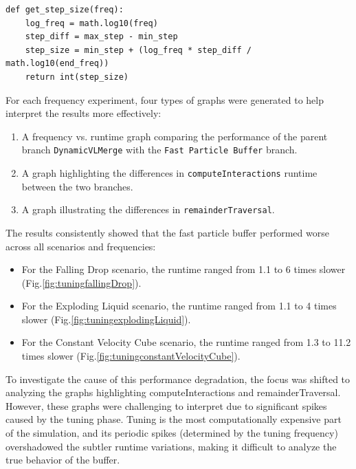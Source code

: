 \begin{lstlisting}[style=mypython]
def get_step_size(freq):
    log_freq = math.log10(freq)
    step_diff = max_step - min_step
    step_size = min_step + (log_freq * step_diff / math.log10(end_freq))
    return int(step_size)
\end{lstlisting}

For each frequency experiment, four types of graphs were generated to help interpret the results more effectively:

\begin{enumerate}
    \item A frequency vs. runtime graph comparing the performance of the parent branch \texttt{DynamicVLMerge} with the \texttt{Fast Particle Buffer} branch.
    \item A graph highlighting the differences in \texttt{computeInteractions} runtime between the two branches.
    \item A graph illustrating the differences in \texttt{remainderTraversal}.
\end{enumerate}

The results consistently showed that the fast particle buffer performed worse across all scenarios and frequencies:
\begin{itemize}
    \item For the Falling Drop scenario, the runtime ranged from 1.1 to 6 times slower (Fig.\ref{fig:tuningfallingDrop}).
    \item For the Exploding Liquid scenario, the runtime ranged from 1.1 to 4 times slower (Fig.\ref{fig:tuningexplodingLiquid}).
    \item For the Constant Velocity Cube scenario, the runtime ranged from 1.3 to 11.2 times slower (Fig.\ref{fig:tuningconstantVelocityCube}).
\end{itemize}

To investigate the cause of this performance degradation, the focus was shifted to analyzing the graphs highlighting computeInteractions and remainderTraversal. However, these graphs were challenging to interpret due to significant spikes caused by the tuning phase. Tuning is the most computationally expensive part of the simulation, and its periodic spikes (determined by the tuning frequency) overshadowed the subtler runtime variations, making it difficult to analyze the true behavior of the buffer.


